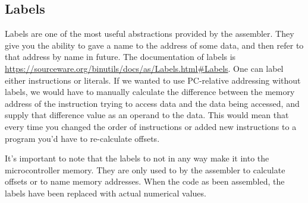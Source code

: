 \subsection{Labels}
Labels are one of the most useful abstractions provided by the assembler. They give you the ability to gave a name to the address of some data, and then refer to that address by name in future. The documentation of labels is \url{https://sourceware.org/binutils/docs/as/Labels.html#Labels}. One can label either instructions or literals. If we wanted to use PC-relative addressing without labels, we would have to manually calculate the difference between the memory address of the instruction trying to access data and the data being accessed, and supply that difference value as an operand to the data. This would mean that every time you changed the order of instructions or added new instructions to a program you'd have to re-calculate offsets. 

It's important to note that the labels to not in any way make it into the microcontroller memory. They are only used to by the assembler to calculate offsets or to name memory addresses. When the code as been assembled, the labels have been replaced with actual numerical values. 

